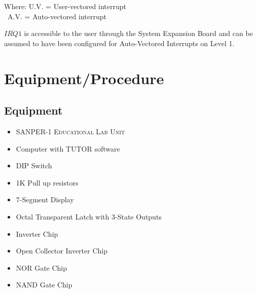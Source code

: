 \documentclass[12pt,Letter]{article}
\begin{document}
\begin{table}[H]
	\noindent{}

	\vspace{0.5cm}
	Where:	\hspace{3.5ex}U.V. = User-vectored interrupt\\
	\-\ \hspace{11ex}A.V. = Auto-vectored interrupt
	\caption{Sanper Interrupt Signals}
	\label{tab:sanper}
\end{table}

\noindent $\overline{IRQ1}$ is accessible to the user through the System Expansion Board and can be assumed to have been configured for Auto-Vectored Interrupts on Level 1.
\section{Equipment/Procedure}
\subsection{Equipment}
\begin{itemize}
	\item \textsc{SANPER-1 Educational Lab Unit}
	\item Computer with TUTOR software
	\item DIP Switch
	\item 1K Pull up resistors
	\item 7-Segment Display
	\item Octal Transparent Latch with 3-State Outputs
	\item Inverter Chip
	\item Open Collector Inverter Chip
	\item NOR Gate Chip
	\item NAND Gate Chip

\end{itemize}
\end{document}
